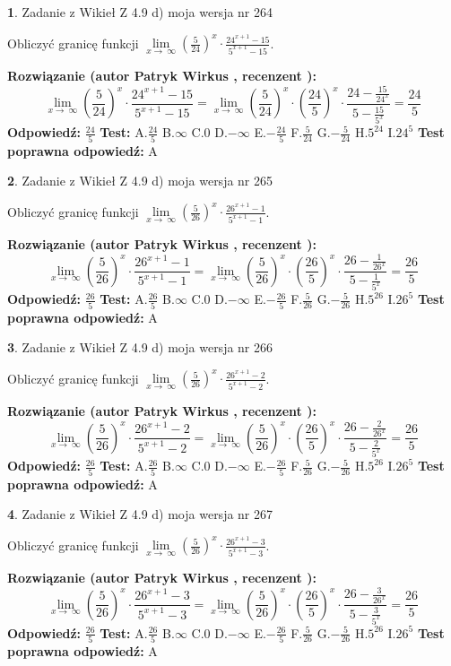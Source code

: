 \documentclass[12pt, a4paper]{article}
\theoremstyle{definition} %
\newtheorem{zad}{}
\newcommand{\zadStart}[1]{\begin{zad}#1\newline}
\newcommand{\zadStop}{\end{zad}}
\newcommand{\rozwStart}[2]{\noindent \textbf{Rozwiązanie (autor #1 , recenzent #2): }\newline}
\newcommand{\rozwStop}{\newline}
\newcommand{\odpStart}{\noindent \textbf{Odpowiedź:}\newline}
\newcommand{\odpStop}{\newline}
\newcommand{\testStart}{\noindent \textbf{Test:}\newline}
\newcommand{\testStop}{\newline}
\newcommand{\kluczStart}{\noindent \textbf{Test poprawna odpowiedź:}\newline}
\newcommand{\kluczStop}{\newline}
\begin{document}
\zadStart{Zadanie z Wikieł Z 4.9 d) moja wersja nr 264}


Obliczyć granicę funkcji  $\lim\limits_{x\to\ \infty}(\frac{5}{24})^{x}\cdot\frac{24^{x+1}-15}{5^{x+1}-15}$.
\zadStop
\rozwStart{Patryk Wirkus}{}
$$\lim\limits_{x\to\ \infty}(\frac{5}{24})^{x}\cdot\frac{24^{x+1}-15}{5^{x+1}-15}=\lim\limits_{x\to\ \infty}(\frac{5}{24})^{x}\cdot(\frac{24}{5})^{x} \cdot \frac{24-\frac{15}{24^{x}}}{5-\frac{15}{5^{x}}} = \frac{24}{5}$$
\rozwStop
\odpStart
$\frac{24}{5}$
\odpStop
\testStart
A.$\frac{24}{5}$ B.$\infty$ C.$0$ D.$-\infty$ E.$-\frac{24}{5}$
F.$\frac{5}{24}$ G.$-\frac{5}{24}$
H.$5^{24}$
I.$24^{5}$
\testStop
\kluczStart
A
\kluczStop



\zadStart{Zadanie z Wikieł Z 4.9 d) moja wersja nr 265}


Obliczyć granicę funkcji  $\lim\limits_{x\to\ \infty}(\frac{5}{26})^{x}\cdot\frac{26^{x+1}-1}{5^{x+1}-1}$.
\zadStop
\rozwStart{Patryk Wirkus}{}
$$\lim\limits_{x\to\ \infty}(\frac{5}{26})^{x}\cdot\frac{26^{x+1}-1}{5^{x+1}-1}=\lim\limits_{x\to\ \infty}(\frac{5}{26})^{x}\cdot(\frac{26}{5})^{x} \cdot \frac{26-\frac{1}{26^{x}}}{5-\frac{1}{5^{x}}} = \frac{26}{5}$$
\rozwStop
\odpStart
$\frac{26}{5}$
\odpStop
\testStart
A.$\frac{26}{5}$ B.$\infty$ C.$0$ D.$-\infty$ E.$-\frac{26}{5}$
F.$\frac{5}{26}$ G.$-\frac{5}{26}$
H.$5^{26}$
I.$26^{5}$
\testStop
\kluczStart
A
\kluczStop



\zadStart{Zadanie z Wikieł Z 4.9 d) moja wersja nr 266}


Obliczyć granicę funkcji  $\lim\limits_{x\to\ \infty}(\frac{5}{26})^{x}\cdot\frac{26^{x+1}-2}{5^{x+1}-2}$.
\zadStop
\rozwStart{Patryk Wirkus}{}
$$\lim\limits_{x\to\ \infty}(\frac{5}{26})^{x}\cdot\frac{26^{x+1}-2}{5^{x+1}-2}=\lim\limits_{x\to\ \infty}(\frac{5}{26})^{x}\cdot(\frac{26}{5})^{x} \cdot \frac{26-\frac{2}{26^{x}}}{5-\frac{2}{5^{x}}} = \frac{26}{5}$$
\rozwStop
\odpStart
$\frac{26}{5}$
\odpStop
\testStart
A.$\frac{26}{5}$ B.$\infty$ C.$0$ D.$-\infty$ E.$-\frac{26}{5}$
F.$\frac{5}{26}$ G.$-\frac{5}{26}$
H.$5^{26}$
I.$26^{5}$
\testStop
\kluczStart
A
\kluczStop



\zadStart{Zadanie z Wikieł Z 4.9 d) moja wersja nr 267}


Obliczyć granicę funkcji  $\lim\limits_{x\to\ \infty}(\frac{5}{26})^{x}\cdot\frac{26^{x+1}-3}{5^{x+1}-3}$.
\zadStop
\rozwStart{Patryk Wirkus}{}
$$\lim\limits_{x\to\ \infty}(\frac{5}{26})^{x}\cdot\frac{26^{x+1}-3}{5^{x+1}-3}=\lim\limits_{x\to\ \infty}(\frac{5}{26})^{x}\cdot(\frac{26}{5})^{x} \cdot \frac{26-\frac{3}{26^{x}}}{5-\frac{3}{5^{x}}} = \frac{26}{5}$$
\rozwStop
\odpStart
$\frac{26}{5}$
\odpStop
\testStart
A.$\frac{26}{5}$ B.$\infty$ C.$0$ D.$-\infty$ E.$-\frac{26}{5}$
F.$\frac{5}{26}$ G.$-\frac{5}{26}$
H.$5^{26}$
I.$26^{5}$
\testStop
\kluczStart
A
\kluczStop
\end{document}

